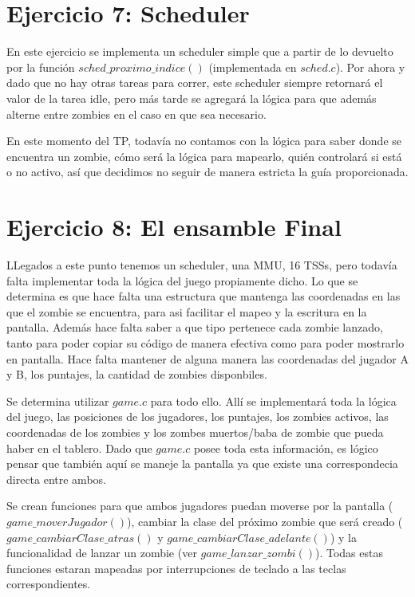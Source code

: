 \documentclass[a4paper]{article}
\begin{document}
\section{Ejercicio 7: Scheduler}

En este ejercicio se implementa un scheduler simple que a partir de lo devuelto por la función $sched\_ proximo\_ indice()$ (implementada en $sched.c$). Por ahora y dado que no hay otras tareas para correr, este scheduler siempre retornará el valor de la tarea idle, pero más tarde se agregará la lógica para que además alterne entre zombies en el caso en que sea necesario.

En este momento del TP, todavía no contamos con la lógica para saber donde se encuentra un zombie, cómo será la lógica para mapearlo, quién controlará si está o no activo, así que decidimos no seguir de manera estricta la guía proporcionada.

\section{Ejercicio 8: El ensamble Final}

LLegados a este punto tenemos un scheduler, una MMU, 16 TSSs, pero todavía falta implementar toda la lógica del juego propiamente dicho. Lo que se determina es que hace falta una estructura que mantenga las coordenadas en las que el zombie se encuentra, para asi facilitar el mapeo y la escritura en la pantalla. Además hace falta saber a que tipo pertenece cada zombie lanzado, tanto para poder copiar su código de manera efectiva como para poder mostrarlo en pantalla. Hace falta mantener de alguna manera las coordenadas del jugador A y B, los puntajes, la cantidad de zombies disponbiles.

Se determina utilizar $game.c$ para todo ello. Allí se implementará toda la lógica del juego, las posiciones de los jugadores, los puntajes, los zombies activos, las coordenadas de los zombies y los zombes muertos/baba de zombie que pueda haber en el tablero. Dado que $game.c$ posee toda esta información, es lógico pensar que también aquí se maneje la pantalla ya que existe una correspondecia directa entre ambos.

Se crean funciones para que ambos jugadores puedan moverse por la pantalla ($game\_ moverJugador()$), cambiar la clase del próximo zombie que será creado ($game\_ cambiarClase\_ atras()$ y $game\_ cambiarClase\_ adelante()$) y la funcionalidad de lanzar un zombie (ver $game\_ lanzar\_ zombi()$). Todas estas funciones estaran mapeadas por interrupciones de teclado a las teclas correspondientes.
\end{document}
